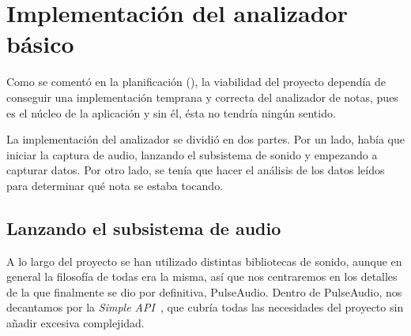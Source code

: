 \section{Implementación del analizador básico}
\label{sec:implementacion_analizador}
Como se comentó en la planificación (\textit{}), la
viabilidad del proyecto dependía de conseguir una implementación temprana y
correcta del analizador de notas, pues es el núcleo de la aplicación y sin él,
ésta no tendría ningún sentido.

La implementación del analizador se dividió en dos partes. Por un lado, había
que iniciar la captura de audio, lanzando el subsistema de sonido y empezando a
capturar datos. Por otro lado, se tenía que hacer el análisis de los datos
leídos para determinar qué nota se estaba tocando.

\subsection{Lanzando el subsistema de audio}
A lo largo del proyecto se han utilizado distintas bibliotecas de sonido, aunque
en general la filosofía de todas era la misma, así que nos centraremos en los
detalles de la que finalmente se dio por definitiva, PulseAudio. Dentro de
PulseAudio, nos decantamos por la \textit{Simple API}~\cite{pulseaudiosimple},
que cubría todas las necesidades del proyecto sin añadir excesiva complejidad.

